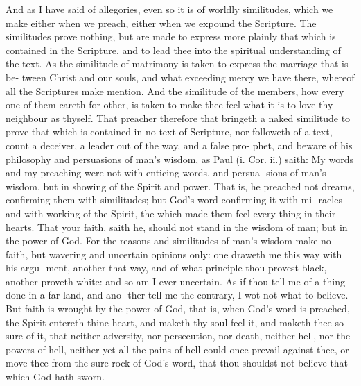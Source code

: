 \documentclass{custom}
\begin{document}
And as I have said of allegories, even so it is of worldly 
similitudes, which we make either when we preach, 
either when we expound the Scripture. The similitudes 
prove nothing, but are made to express more plainly that 
which is contained in the Scripture, and to lead thee into 
the spiritual understanding of the text. As the similitude 
of matrimony is taken to express the marriage that is be- 
tween Christ and our souls, and what exceeding mercy we 
have there, whereof all the Scriptures make mention. 
And the similitude of the members, how every one of them 
careth for other, is taken to make thee feel what it is to 
love thy neighbour as thyself. That preacher therefore
that bringeth a naked similitude to prove that which is
contained in no text of Scripture, nor followeth of a text,
count a deceiver, a leader out of the way, and a false pro-
phet, and beware of his philosophy and persuasions of
man's wisdom, as Paul (i. Cor. ii.) saith: My words and
my preaching were not with enticing words, and persua-
sions of man's wisdom, but in showing of the Spirit and
power. That is, he preached not dreams, confirming them 
with similitudes; but God's word confirming it with mi- 
racles and with working of the Spirit, the which made 
them feel every thing in their hearts. That your faith, 
saith he, should not stand in the wisdom of man; but in 
the power of God. For the reasons and similitudes of
man's wisdom make no faith, but wavering and uncertain
opinions only: one draweth me this way with his argu-
ment, another that way, and of what principle thou provest
black, another proveth white: and so am I ever uncertain.
As if thou tell me of a thing done in a far land, and ano-
ther tell me the contrary, I wot not what to believe. 
But faith is wrought by the power of God, that is, when
God's word is preached, the Spirit entereth thine heart,
and maketh thy soul feel it, and maketh thee so sure of it,
that neither adversity, nor persecution, nor death, neither 
hell, nor the powers of hell, neither yet all the pains of hell 
could once prevail against thee, or move thee from the 
sure rock of God's word, that thou shouldst not believe
that which God hath sworn.
\end{document}
